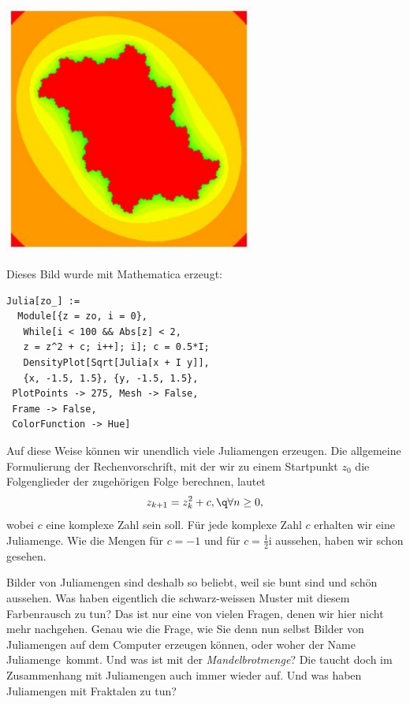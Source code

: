 \documentclass[%
11pt,%
twoside,%
titlepage,%
german,%
headsepline%
]{scrartcl}
\begin{document}
\begin{center}
\includegraphics[width=0.618\textwidth]{pictures/julia3}
\end{center}

\begin{bem}
Dieses Bild wurde mit Mathematica erzeugt:

\begin{lstlisting}
Julia[zo_] := 
  Module[{z = zo, i = 0}, 
   While[i < 100 && Abs[z] < 2,
   z = z^2 + c; i++]; i]; c = 0.5*I;
   DensityPlot[Sqrt[Julia[x + I y]],
   {x, -1.5, 1.5}, {y, -1.5, 1.5}, 
 PlotPoints -> 275, Mesh -> False,
 Frame -> False,
 ColorFunction -> Hue]
\end{lstlisting}
\end{bem}

Auf diese Weise k\"onnen wir unendlich viele Juliamengen erzeugen. Die allgemeine Formulierung der Rechenvorschrift, mit der wir zu einem Startpunkt $z_0$ die Folgenglieder der zugeh\"origen Folge berechnen, lautet
$$z_{k+1}=z_k^2+c,\q\forall n\geq0,$$
wobei $c$ eine komplexe Zahl sein soll. F\"ur jede komplexe Zahl $c$ erhalten wir eine
Juliamenge. Wie die Mengen f\"ur $c = -1$ und f\"ur $c = \frac{1}{2}\mathrm{i}$ aussehen, haben wir schon gesehen.

Bilder von Juliamengen sind deshalb so beliebt, weil sie bunt sind und sch\"on aussehen. Was haben eigentlich die schwarz-weissen Muster mit diesem Farbenrausch zu tun?
Das ist nur eine von vielen Fragen, denen wir hier nicht mehr nachgehen. Genau wie die Frage, wie Sie denn nun selbst Bilder von Juliamengen auf dem Computer erzeugen k\"onnen, oder woher der Name \glqq Juliamenge\grqq\ kommt. Und was ist mit der \emph{Mandelbrotmenge}? Die taucht doch im Zusammenhang mit Juliamengen auch immer wieder auf. Und was haben Juliamengen mit Fraktalen zu tun?

\cleardoublepage
\listoffigures
\listoftables
%
%
\end{document}
